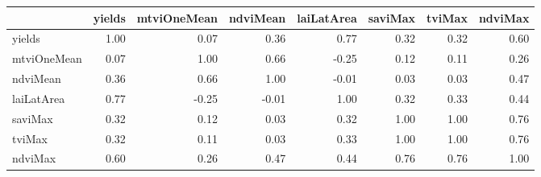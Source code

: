 \begin{tabular}{lrrrrrrr}
\toprule
{} &  yields &  mtviOneMean &  ndviMean &  laiLatArea &  saviMax &  tviMax &  ndviMax \\
\midrule
yields      &    1.00 &         0.07 &      0.36 &        0.77 &     0.32 &    0.32 &     0.60 \\
mtviOneMean &    0.07 &         1.00 &      0.66 &       -0.25 &     0.12 &    0.11 &     0.26 \\
ndviMean    &    0.36 &         0.66 &      1.00 &       -0.01 &     0.03 &    0.03 &     0.47 \\
laiLatArea  &    0.77 &        -0.25 &     -0.01 &        1.00 &     0.32 &    0.33 &     0.44 \\
saviMax     &    0.32 &         0.12 &      0.03 &        0.32 &     1.00 &    1.00 &     0.76 \\
tviMax      &    0.32 &         0.11 &      0.03 &        0.33 &     1.00 &    1.00 &     0.76 \\
ndviMax     &    0.60 &         0.26 &      0.47 &        0.44 &     0.76 &    0.76 &     1.00 \\
\bottomrule
\end{tabular}

